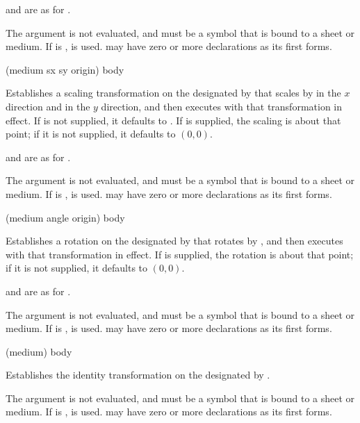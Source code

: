 and  are as for .

The  argument is not evaluated, and must be a symbol that is bound
to a sheet or medium.  If  is ,  is
used.   may have zero or more declarations as its first forms.

 {(medium sx \optional sy origin) \body body}

Establishes a scaling transformation on the  designated by
 that scales by  in the $x$ direction and  in the
$y$ direction, and then executes  with that transformation in effect.
If  is not supplied, it defaults to .  If  is
supplied, the scaling is about that point; if it is not supplied, it defaults to
$(0,0)$.

 and  are as for .

The  argument is not evaluated, and must be a symbol that is bound
to a sheet or medium.  If  is ,  is
used.   may have zero or more declarations as its first forms.

 {(medium angle \optional origin) \body body}

Establishes a rotation on the  designated by  that
rotates by , and then executes  with that transformation in
effect.  If  is supplied, the rotation is about that point; if it is
not supplied, it defaults to $(0,0)$.

 and  are as for .

The  argument is not evaluated, and must be a symbol that is bound
to a sheet or medium.  If  is ,  is
used.   may have zero or more declarations as its first forms.

 {(medium) \body body}

Establishes the identity transformation on the  designated
by .

The  argument is not evaluated, and must be a symbol that is bound
to a sheet or medium.  If  is ,  is
used.   may have zero or more declarations as its first forms.



